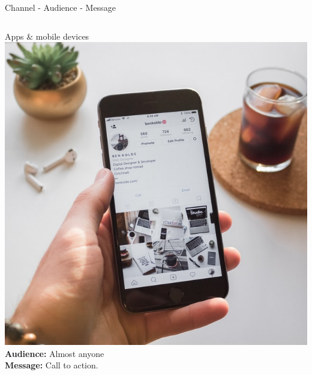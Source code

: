 \begin{frame}{Channel - Audience - Message}

\vspace{-0.75cm}
\begin{columns}
    \begin{column}{0.3\textwidth}
        \begin{block}{Apps \& mobile devices}
            \centering
            \includegraphics[width=\textwidth]{images/ben-kolde-_zqJaEyo6I4-unsplash.jpg}
            {\small
            \textbf{Audience:} Almost anyone\\
            \textbf{Message:} Call to action. %
            }
        \end{block}
    \end{column}
    

\end{columns}
\end{frame}
